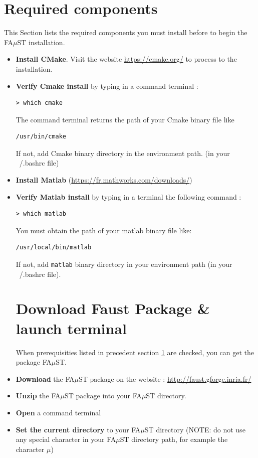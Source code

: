 \section{Required components}\label{sec:RequiredTools}
This Section lists the required components you must install before to begin the FA$\mu$ST installation. 
\begin{itemize}
\item \textbf{Install CMake}. Visit the website \url{https://cmake.org/} to process to the installation.
\item \textbf{Verify Cmake install} by typing in a command terminal : 
\begin{lstlisting}
> which cmake
\end{lstlisting}
The command terminal returns the path of your Cmake binary file like
\begin{lstlisting}[backgroundcolor=\color{white}]
/usr/bin/cmake
\end{lstlisting}
If not, add Cmake binary directory in the environment path. (in your ~/.bashrc file)

\item \textbf{Install Matlab} (\url{https://fr.mathworks.com/downloads/})

\item \textbf{Verify Matlab install} by typing in a terminal the following command : 
\begin{lstlisting}
> which matlab
\end{lstlisting}
You must obtain the path of your matlab binary file like: 
\begin{lstlisting}[backgroundcolor=\color{white}]
/usr/local/bin/matlab
\end{lstlisting}
If not, add \texttt{matlab} binary directory in your environment path (in your ~/.bashrc file). 

\section{Download Faust Package \& launch terminal}\label{sec:UnixBuildDownload}
When prerequisities listed in precedent section \ref{sec:RequiredTools} are checked, you can get the package FA$\mu$ST.
\item \textbf{Download} the FA$\mu$ST package on the website :  \url{http://faust.gforge.inria.fr/}
\item \textbf{Unzip} the FA$\mu$ST package into your FA$\mu$ST directory.
\item \textbf{Open} a command terminal
\item \textbf{Set the current directory} to your FA$\mu$ST directory (NOTE: do not use any special character in your FA$\mu$ST directory path, for example the character $\mu$)








\end{itemize}
